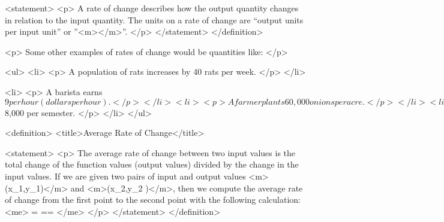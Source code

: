             <statement>
                <p>
                    A rate of change describes how the output quantity changes in relation to the input quantity.
                    The units on a rate of change are “output units per input unit” or ”<m></m>”.
                </p>
            </statement>
        </definition>

        <p>
            Some other examples of rates of change would be quantities like:
        </p>

        <ul>
            <li>
                <p>
                    A population of rats increases by 40 rats per week.
                </p>
            </li>

            <li>
                <p>
                    A barista earns $9 per hour (dollars per hour).
                </p>
            </li>

            <li>
                <p>
                    A farmer plants 60,000 onions per acre.
                </p>
            </li>

            <li>
                <p>
                    A car can drive 27 miles per gallon of gasoline.
                </p>
            </li>

            <li>
                <p>
                    A population of grey whales decreases by 8 whales per year.
                </p>
            </li>

            <li>
                <p>
                    The amount of money in your college account decreases by $8,000 per semester.
                </p>
            </li>
        </ul>

        <definition>
            <title>Average Rate of Change</title>

            <statement>
                <p>
                    The average rate of change between two input values is the total change of the function values (output values) divided by the change in the input values.
                    If we are given two pairs of input and output values <m>(x_{1},y_{1})</m> and <m>(x_{2},y_{2} )</m>, then we compute the average rate of change from the first point to the second point with the following calculation:
                    <me>
                        = ==
                    </me>
                </p>
            </statement>
        </definition>

